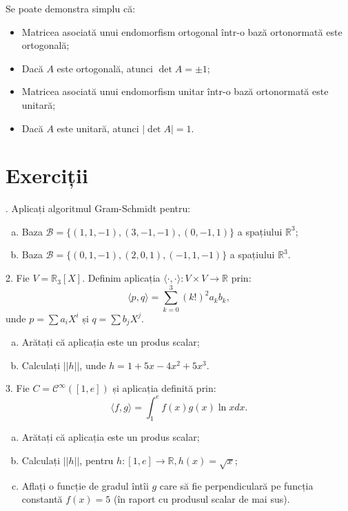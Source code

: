 \documentclass[11pt,a4paper]{article}
\newcommand\kal{\mathcal}
\newcommand\RR{\mathbb{R}}
\theoremstyle{dotless}
\theoremstyle{dotlessdr}
\begin{document}
Se poate demonstra simplu că:
\begin{itemize}
\item Matricea asociată unui endomorfism ortogonal într-o bază ortonormată
  este ortogonală;
\item Dacă $A$ este ortogonală, atunci $\det A = \pm 1$;
\item Matricea asociată unui endomorfism unitar într-o bază ortonormată este
  unitară;
\item Dacă $A$ este unitară, atunci $|\det A| = 1$.
\end{itemize}


\section{Exerciții}
\label{sec:exc}

\indent{}. Aplicați algoritmul Gram-Schmidt pentru:
\begin{enumerate}[(a)]
\item Baza $\kal{B} = \{(1, 1, -1), (3, -1, -1), (0, -1, 1) \}$ a spațiului $\RR^3$;
\item Baza $\kal{B} = \{(0, 1, -1), (2, 0, 1), (-1, 1, -1) \}$ a spațiului $\RR^3$.
\end{enumerate}

\vspace{1cm}

2. Fie $V = \RR_3[X]$. Definim aplicația $\langle \cdot, \cdot \rangle : V \times V \to \RR$
prin:
\[
  \langle p, q \rangle = \sum_{k = 0}^3 (k!)^2 a_k b_k,
\]
unde $p = \sum a_i X^i$ și $q = \sum b_j X^j$.

\begin{enumerate}[(a)]
\item Arătați că aplicația este un produs scalar;
\item Calculați $||h||$, unde $h = 1 + 5x - 4x^2 + 5x^3$.
\end{enumerate}

\vspace{1cm}

3. Fie $C = \kal{C}^\infty([1, e])$ și aplicația definită prin:
\[
  \langle f, g \rangle = \int_1^e f(x) g(x) \ln x dx.
\]
\begin{enumerate}[(a)]
\item Arătați că aplicația este un produs scalar;
\item Calculați $||h||$, pentru $h : [1, e] \to \RR, h(x) = \sqrt{x}$;
\item Aflați o funcție de gradul întîi $g$ care să fie perpendiculară pe
  funcția constantă $f(x) = 5$ (în raport cu produsul scalar de mai sus).
\end{enumerate}
\end{document}
